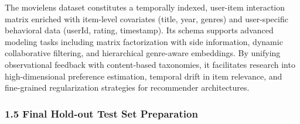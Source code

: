 \documentclass[
]{article}
\begin{document}
The movielens dataset constitutes a temporally indexed, user-item
interaction matrix enriched with item-level covariates (title, year,
genres) and user-specific behavioral data (userId, rating, timestamp).
Its schema supports advanced modeling tasks including matrix
factorization with side information, dynamic collaborative filtering,
and hierarchical genre-aware embeddings. By unifying observational
feedback with content-based taxonomies, it facilitates research into
high-dimensional preference estimation, temporal drift in item
relevance, and fine-grained regularization strategies for recommender
architectures.

\subsubsection{1.5 Final Hold-out Test Set
Preparation}\label{final-hold-out-test-set-preparation}
\end{document}

